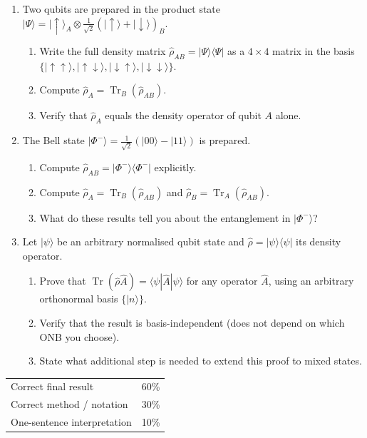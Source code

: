 \documentclass[11pt,a4paper]{article}
\begin{document}
\begin{tcolorbox}[ugprobbox, title={Part C --- Translation \hfill\normalfont 3 problems}]

\begin{enumerate}[leftmargin=1.8em, label=\textbf{C\arabic*.}, itemsep=12pt]

\item {}
  Two qubits are prepared in the product state
  $|\Psi\rangle=|\uparrow\rangle_A\otimes\tfrac{1}{\sqrt{2}}(|\uparrow\rangle+|\downarrow\rangle)_B$.
  \begin{enumerate}[label=(\alph*)]
    \item Write the full density matrix $\hat{\rho}_{AB}=|\Psi\rangle\langle\Psi|$
          as a $4\times 4$ matrix in the basis $\{|{\uparrow\uparrow}\rangle,|{\uparrow\downarrow}\rangle,|{\downarrow\uparrow}\rangle,|{\downarrow\downarrow}\rangle\}$.
    \item Compute $\hat{\rho}_A=\operatorname{Tr}_B(\hat{\rho}_{AB})$.
    \item Verify that $\hat{\rho}_A$ equals the density operator of qubit $A$ alone.
  \end{enumerate}

\item {}
  The Bell state $|\Phi^-\rangle=\tfrac{1}{\sqrt{2}}(|00\rangle-|11\rangle)$
  is prepared.
  \begin{enumerate}[label=(\alph*)]
    \item Compute $\hat{\rho}_{AB}=|\Phi^-\rangle\langle\Phi^-|$ explicitly.
    \item Compute $\hat{\rho}_A=\operatorname{Tr}_B(\hat{\rho}_{AB})$ and $\hat{\rho}_B=\operatorname{Tr}_A(\hat{\rho}_{AB})$.
    \item What do these results tell you about the entanglement in $|\Phi^-\rangle$?
  \end{enumerate}

\item {}
  Let $|\psi\rangle$ be an arbitrary normalised qubit state and
  $\hat{\rho}=|\psi\rangle\langle\psi|$ its density operator.
  \begin{enumerate}[label=(\alph*)]
    \item Prove that $\operatorname{Tr}(\hat{\rho}\hat{A})=\langle\psi|\hat{A}|\psi\rangle$
          for any operator $\hat{A}$, using an arbitrary orthonormal basis $\{|n\rangle\}$.
    \item Verify that the result is basis-independent (does not depend on which ONB you choose).
    \item State what additional step is needed to extend this proof to mixed states.
  \end{enumerate}

\end{enumerate}
\end{tcolorbox}

\begin{tcolorbox}[rubricbox, title={SPSU Rubric (per problem)}]
\begin{tabular}{ll}
Correct final result  & 60\%\\
Correct method / notation & 30\%\\
One-sentence interpretation & 10\%\\
\end{tabular}
\end{tcolorbox}
\end{document}

